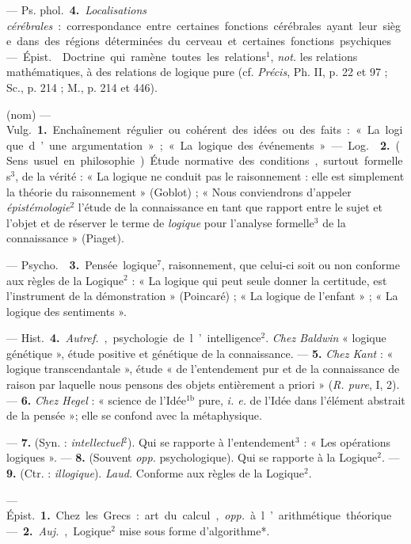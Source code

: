 \begin{itemize}[leftmargin=1cm, label=, itemsep=1pt]
— \si{Ps. phol.} {\bf 4.} {\it Localisations cérébrales} : correspondance
entre certaines fonctions cérébrales ayant leur siège dans des régions
déterminées du cerveau et certaines fonctions psychiques.

 — \si{Épist.}  Doctrine qui ramène toutes les
relations$^1$, {\it not.} les relations mathématiques, à des relations de
logique pure (cf. {\it Précis}, Ph. II, p. 22 et 97 ; Sc., p. 214 ; M., p.
214 et 446).

 (nom) — \si{Vulg.} {\bf 1.} Enchaînement régulier ou cohérent
des idées ou des faits : « La logique d’une argumentation » ; « La logique
des événements ».

— \si{Log.}  {\bf 2.} (Sens usuel en philosophie). Étude
normative des conditions, surtout formelles$^3$, de la vérité :
« La logique ne conduit pas le raisonnement : elle est simplement la théorie
du raisonnement » (Goblot) ; « Nous conviendrons d'appeler
{\it épistémologie}$^2$ l'étude de la connaissance en tant que rapport entre
le sujet et l’objet et de réserver le terme de {\it logique} pour l'analyse
formelle$^3$ de la connaissance » (Piaget).

— \si{Psycho.}  {\bf 3.} Pensée logique$^7$, raisonnement, que
celui-ci soit ou non conforme aux règles de la Logique$^2$ : « La logique qui
peut seule donner la certitude, est l’instrument de la
démonstration » (Poincaré) ; « La logique de l’enfant » ; « La logique des
sentiments ».

— \si{Hist.} {\bf 4.} {\it Autref.}, psychologie de l’intelligence$^2$.
{\it Chez Baldwin} « logique génétique », étude positive et génétique de la
connaissance. — {\bf 5.} {\it Chez Kant} : « logique transcendantale », étude
« de l’entendement pur et de la connaissance de raison par laquelle nous
pensons des objets entièrement a priori » ({\it R. pure}, I, 2). — {\bf 6.}
{\it Chez Hegel} : « science de l'Idée$^\text{1b}$ pure, {\it i. e.} de
l’Idée dans l'élément abstrait de la pensée »; elle se confond avec la
métaphysique.

 — {\bf 7.} (Syn. : {\it intellectuel}$^2$). Qui se
rapporte à l’entendement$^3$ : « Les opérations logiques ». — {\bf 8.}
(Souvent {\it opp.} psychologique). Qui se rapporte à la Logique$^2$. —
{\bf 9.} (Ctr. : {\it illogique}). {\it Laud.} Conforme aux règles de la
Logique$^2$.

 — \si{Épist.} {\bf 1.} Chez les Grecs : art du calcul,
{\it opp.} à l’arithmétique théorique. — {\bf 2.} {\it Auj.}, Logique$^2$
mise sous forme d’algorithme*.


\end{itemize}
